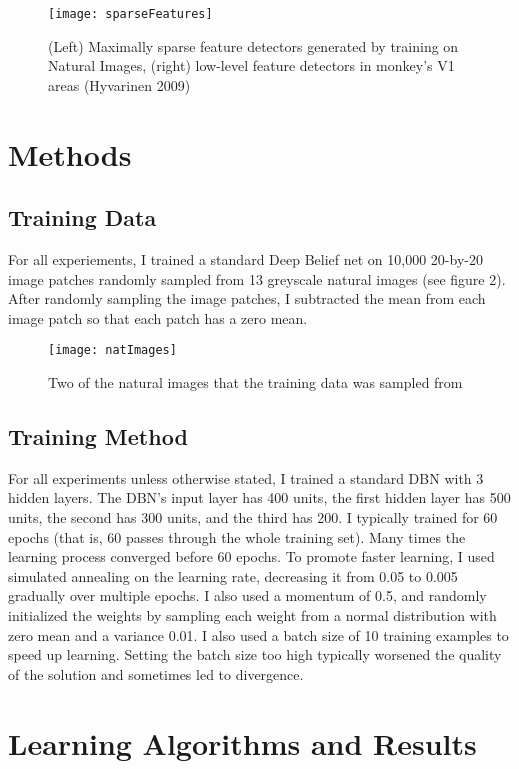 \documentclass{article} %
\begin{document}
\begin{figure}[t]
\texttt{[image: sparseFeatures]}
\caption{(Left) Maximally sparse feature detectors generated by training on Natural Images, (right) low-level feature detectors in monkey's V1 areas (Hyvarinen 2009)}
\end{figure}

\section{Methods}

\subsection{Training Data}

For all experiements, I trained a standard Deep Belief net on 10,000 20-by-20 image patches randomly sampled from 13 greyscale natural images (see figure 2). After randomly sampling the image patches, I subtracted the mean from each image patch so that each patch has a zero mean. 

\begin{figure}[t]
\texttt{[image: natImages]}
\caption{Two of the natural images that the training data was sampled from}
\end{figure}

\subsection{Training Method}

For all experiments unless otherwise stated, I trained a standard DBN with 3 hidden layers. The DBN's input layer has 400 units, the first hidden layer has 500 units, the second has 300 units, and the third has 200. I typically trained for 60 epochs (that is, 60 passes through the whole training set). Many times the learning process converged before 60 epochs. To promote faster learning, I used simulated annealing on the learning rate, decreasing it from 0.05 to 0.005 gradually over multiple epochs. I also used a momentum of 0.5, and randomly initialized the weights by sampling each weight from a normal distribution with zero mean and a variance 0.01. I also used a batch size of 10 training examples to speed up learning. Setting the batch size too high typically worsened the quality of the solution and sometimes led to divergence. 


\section{Learning Algorithms and Results}
\end{document}
